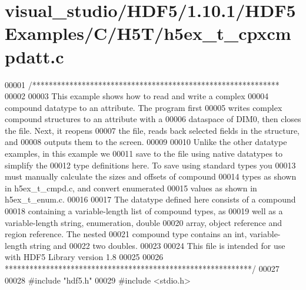 \hypertarget{visual__studio_2_h_d_f5_21_810_81_2_h_d_f5_examples_2_c_2_h5_t_2h5ex__t__cpxcmpdatt_8c_source}{}\section{visual\+\_\+studio/\+H\+D\+F5/1.10.1/\+H\+D\+F5\+Examples/\+C/\+H5\+T/h5ex\+\_\+t\+\_\+cpxcmpdatt.c}
\label{visual__studio_2_h_d_f5_21_810_81_2_h_d_f5_examples_2_c_2_h5_t_2h5ex__t__cpxcmpdatt_8c_source}

\begin{DoxyCode}
00001 \textcolor{comment}{/************************************************************}
00002 \textcolor{comment}{}
00003 \textcolor{comment}{  This example shows how to read and write a complex}
00004 \textcolor{comment}{  compound datatype to an attribute.  The program first}
00005 \textcolor{comment}{  writes complex compound structures to an attribute with a}
00006 \textcolor{comment}{  dataspace of DIM0, then closes the file.  Next, it reopens}
00007 \textcolor{comment}{  the file, reads back selected fields in the structure, and}
00008 \textcolor{comment}{  outputs them to the screen.}
00009 \textcolor{comment}{}
00010 \textcolor{comment}{  Unlike the other datatype examples, in this example we}
00011 \textcolor{comment}{  save to the file using native datatypes to simplify the}
00012 \textcolor{comment}{  type definitions here.  To save using standard types you}
00013 \textcolor{comment}{  must manually calculate the sizes and offsets of compound}
00014 \textcolor{comment}{  types as shown in h5ex\_t\_cmpd.c, and convert enumerated}
00015 \textcolor{comment}{  values as shown in h5ex\_t\_enum.c.}
00016 \textcolor{comment}{}
00017 \textcolor{comment}{  The datatype defined here consists of a compound}
00018 \textcolor{comment}{  containing a variable-length list of compound types, as}
00019 \textcolor{comment}{  well as a variable-length string, enumeration, double}
00020 \textcolor{comment}{  array, object reference and region reference.  The nested}
00021 \textcolor{comment}{  compound type contains an int, variable-length string and}
00022 \textcolor{comment}{  two doubles.}
00023 \textcolor{comment}{}
00024 \textcolor{comment}{  This file is intended for use with HDF5 Library version 1.8}
00025 \textcolor{comment}{}
00026 \textcolor{comment}{ ************************************************************/}
00027 
00028 \textcolor{preprocessor}{#include "hdf5.h"}
00029 \textcolor{preprocessor}{#include <stdio.h>}

\end{DoxyCode}
